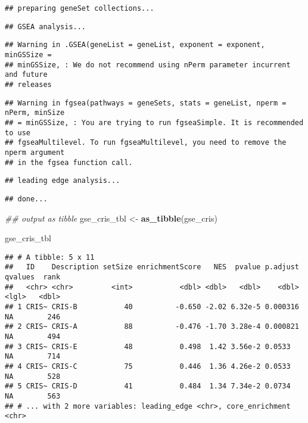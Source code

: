 \documentclass[
]{article}
\newenvironment{Shaded}{\begin{snugshade}}{\end{snugshade}}
\newcommand{\CommentTok}[1]{\textcolor[rgb]{0.56,0.35,0.01}{\textit{#1}}}
\newcommand{\KeywordTok}[1]{\textcolor[rgb]{0.13,0.29,0.53}{\textbf{#1}}}
\newcommand{\NormalTok}[1]{#1}
\newcommand{\StringTok}[1]{\textcolor[rgb]{0.31,0.60,0.02}{#1}}
\begin{document}
\begin{verbatim}
## preparing geneSet collections...
\end{verbatim}

\begin{verbatim}
## GSEA analysis...
\end{verbatim}

\begin{verbatim}
## Warning in .GSEA(geneList = geneList, exponent = exponent, minGSSize =
## minGSSize, : We do not recommend using nPerm parameter incurrent and future
## releases
\end{verbatim}

\begin{verbatim}
## Warning in fgsea(pathways = geneSets, stats = geneList, nperm = nPerm, minSize
## = minGSSize, : You are trying to run fgseaSimple. It is recommended to use
## fgseaMultilevel. To run fgseaMultilevel, you need to remove the nperm argument
## in the fgsea function call.
\end{verbatim}

\begin{verbatim}
## leading edge analysis...
\end{verbatim}

\begin{verbatim}
## done...
\end{verbatim}

\begin{Shaded}
\begin{Highlighting}[]
\CommentTok{## output as tibble}
\NormalTok{gse_cris_tbl <-}\StringTok{ }\KeywordTok{as_tibble}\NormalTok{(gse_cris)}

\NormalTok{gse_cris_tbl}
\end{Highlighting}
\end{Shaded}

\begin{verbatim}
## # A tibble: 5 x 11
##   ID    Description setSize enrichmentScore   NES  pvalue p.adjust qvalues  rank
##   <chr> <chr>         <int>           <dbl> <dbl>   <dbl>    <dbl> <lgl>   <dbl>
## 1 CRIS~ CRIS-B           40          -0.650 -2.02 6.32e-5 0.000316 NA        246
## 2 CRIS~ CRIS-A           88          -0.476 -1.70 3.28e-4 0.000821 NA        494
## 3 CRIS~ CRIS-E           48           0.498  1.42 3.56e-2 0.0533   NA        714
## 4 CRIS~ CRIS-C           75           0.446  1.36 4.26e-2 0.0533   NA        528
## 5 CRIS~ CRIS-D           41           0.484  1.34 7.34e-2 0.0734   NA        563
## # ... with 2 more variables: leading_edge <chr>, core_enrichment <chr>
\end{verbatim}
\end{document}
